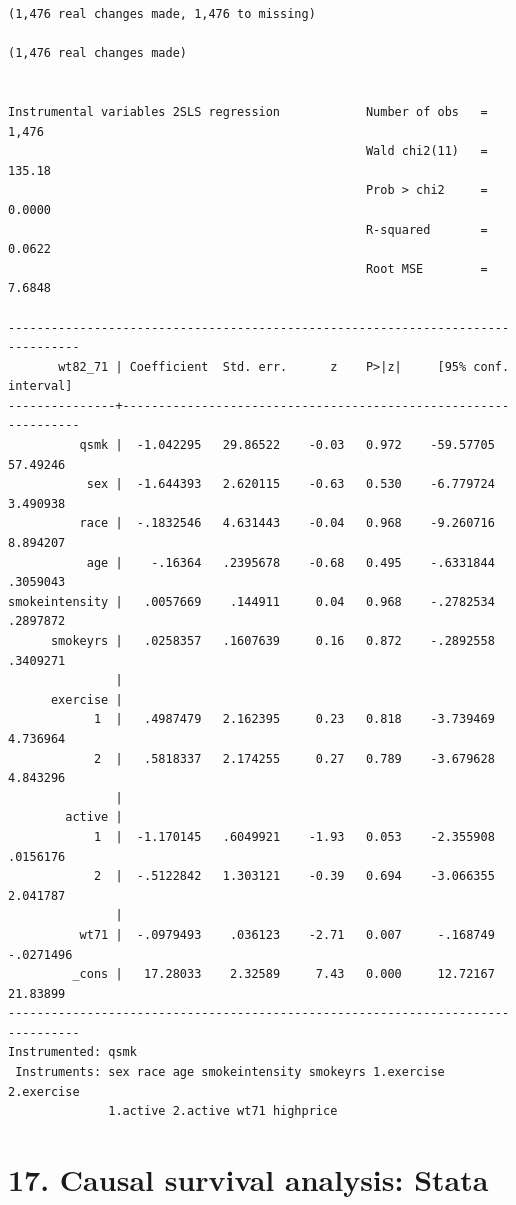 \documentclass[
  10pt,
  a4paper,
]{book}
\begin{document}
\begin{verbatim}
(1,476 real changes made, 1,476 to missing)

(1,476 real changes made)


Instrumental variables 2SLS regression            Number of obs   =      1,476
                                                  Wald chi2(11)   =     135.18
                                                  Prob > chi2     =     0.0000
                                                  R-squared       =     0.0622
                                                  Root MSE        =     7.6848

--------------------------------------------------------------------------------
       wt82_71 | Coefficient  Std. err.      z    P>|z|     [95% conf. interval]
---------------+----------------------------------------------------------------
          qsmk |  -1.042295   29.86522    -0.03   0.972    -59.57705    57.49246
           sex |  -1.644393   2.620115    -0.63   0.530    -6.779724    3.490938
          race |  -.1832546   4.631443    -0.04   0.968    -9.260716    8.894207
           age |    -.16364   .2395678    -0.68   0.495    -.6331844    .3059043
smokeintensity |   .0057669    .144911     0.04   0.968    -.2782534    .2897872
      smokeyrs |   .0258357   .1607639     0.16   0.872    -.2892558    .3409271
               |
      exercise |
            1  |   .4987479   2.162395     0.23   0.818    -3.739469    4.736964
            2  |   .5818337   2.174255     0.27   0.789    -3.679628    4.843296
               |
        active |
            1  |  -1.170145   .6049921    -1.93   0.053    -2.355908    .0156176
            2  |  -.5122842   1.303121    -0.39   0.694    -3.066355    2.041787
               |
          wt71 |  -.0979493    .036123    -2.71   0.007     -.168749   -.0271496
         _cons |   17.28033    2.32589     7.43   0.000     12.72167    21.83899
--------------------------------------------------------------------------------
Instrumented: qsmk
 Instruments: sex race age smokeintensity smokeyrs 1.exercise 2.exercise
              1.active 2.active wt71 highprice
\end{verbatim}

\hypertarget{causal-survival-analysis-stata}{%
\chapter*{17. Causal survival analysis: Stata}\label{causal-survival-analysis-stata}}
\end{document}

